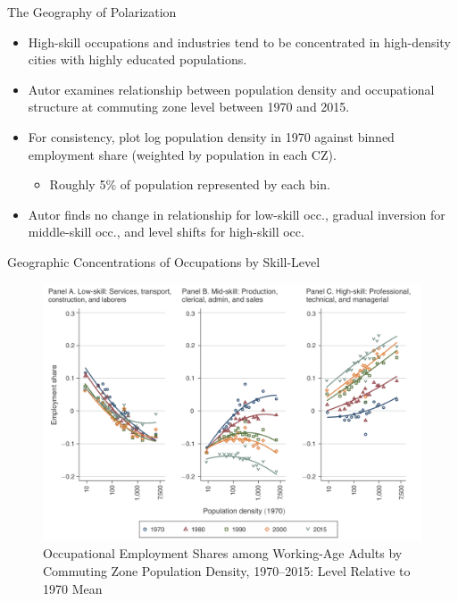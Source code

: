 \documentclass{beamer}
\begin{document}
\begin{frame}{The Geography of Polarization}

\begin{itemize}
	
	\item High-skill occupations and industries tend to be concentrated in high-density cities with highly educated populations.
	
	\bigskip
	
	\item Autor examines relationship between population density and occupational structure at commuting zone level between 1970 and 2015.
	
	\item For consistency, plot log population density in 1970 against binned employment share (weighted by population in each CZ).
	
	\begin{itemize}
		
		\item Roughly 5\% of population represented by each bin.
		
	\end{itemize}

	\bigskip

	\item Autor finds no change in relationship for low-skill occ., gradual inversion for middle-skill occ., and level shifts for high-skill occ.
	
\end{itemize}

\end{frame}


\begin{frame}{Geographic Concentrations of Occupations by Skill-Level}

\begin{figure}
	\begin{center}
		\includegraphics[scale=0.29]{Figures/Fig4_OccShares_LogDensity}

		\caption{Occupational Employment Shares among Working-Age Adults by Commuting Zone Population Density, 1970–2015: Level Relative to 1970 Mean}
	\end{center}
	
\end{figure}


\end{frame}
\end{document}
